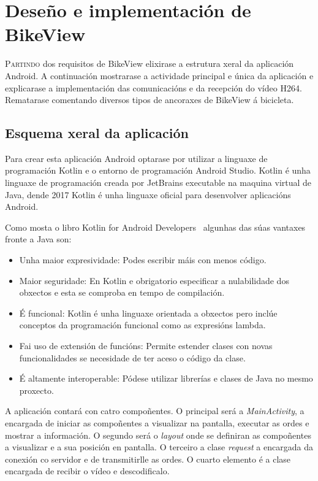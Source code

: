 \chapter{Deseño e implementación de BikeView}
\label{chap:implementacion_aplicacion}
\lettrine{P}{artindo} dos requisitos de BikeView elixirase a estrutura xeral da aplicación Android. A continuación mostrarase a actividade principal e única da aplicación e explicarase a implementación das comunicacións e da recepción do vídeo H264. Rematarase comentando diversos tipos de ancoraxes de BikeView á bicicleta.

\section{Esquema xeral da aplicación}
Para crear esta aplicación Android optarase por utilizar a linguaxe de programación Kotlin e o entorno de programación Android Studio. Kotlin é unha linguaxe de programación creada por JetBrains executable na maquina virtual de Java, dende 2017 Kotlin é unha linguaxe oficial para desenvolver aplicacións Android.

Como mosta o libro Kotlin for Android Developers~\cite{leivaKotlinAndroidDevelopers2018} algunhas das súas vantaxes fronte a Java son:
\begin{itemize}
    \item Unha maior expresividade: Podes escribir máis con menos código.
    \item Maior seguridade: En Kotlin e obrigatorio especificar a nulabilidade dos obxectos e esta se comproba en tempo de compilación.
    \item É funcional: Kotlin é unha linguaxe orientada a obxectos pero inclúe conceptos da programación funcional como as expresións lambda.
    \item Fai uso de extensión de funcións: Permite estender clases con novas funcionalidades se necesidade de ter aceso o código da clase.
    \item É altamente interoperable: Pódese utilizar librerías e clases de Java no mesmo proxecto.
\end{itemize}


A aplicación contará con catro compoñentes. O principal será a \emph{MainActivity}, a encargada de iniciar as compoñentes a visualizar na pantalla, executar as ordes e mostrar a información. O segundo será o \emph{layout} onde se definiran as compoñentes a visualizar e a sua posición en pantalla. O terceiro a clase \emph{request} a encargada da conexión co servidor e de transmitirlle as ordes. O cuarto elemento é a clase encargada de recibir o vídeo e descodificalo.

